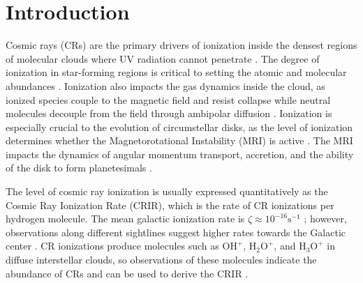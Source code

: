 \documentclass[twocolumn]{aastex63}
\def\t{\text}
\begin{document}
\keywords{}

\section{Introduction}
\label{section:intro}

Cosmic rays (CRs) are the primary drivers of ionization inside the densest regions of molecular clouds where UV radiation cannot penetrate \citep{dalgarno_2006_crs, padovani_2020_review}. The degree of ionization in star-forming regions is critical to setting the atomic and molecular abundances  \citep{wakelam_2012_astrochemistry}. Ionization also impacts the gas dynamics inside the cloud, as ionized species couple to the magnetic field and resist collapse while neutral molecules decouple from the field through ambipolar diffusion \citep{fiedler_1993_ambipolar}. Ionization is especially crucial to the evolution of circumstellar disks, as the level of ionization determines whether the  Magnetorotational Instability (MRI) is active \citep{balbus_1991_mri, gammie_1996_mri}. The MRI impacts the dynamics of angular momentum transport, accretion, and the ability of the disk to form planetesimals \citep{dutrey_2014_protoplanetary}.

 The level of cosmic ray ionization is usually expressed quantitatively as the Cosmic Ray Ionization Rate (CRIR), which is the rate of CR ionizations per hydrogen molecule. The mean galactic ionization rate is $\zeta \approx 10^{-16} \text{s}^{-1}$ \citep{indriolo_2012_crir}; however, observations along different sightlines suggest higher rates towards the Galactic center \citep{indriolo_2015_herschel}. CR ionizations produce molecules such as $\t{OH}^+$, $\t{H}_2\t{O}^+$, and $\t{H}_3\t{O}^+$ in diffuse interstellar clouds, so observations of these molecules indicate the abundance of CRs and can be used to derive the CRIR \citep{indriolo_2015_herschel}.
\end{document}
